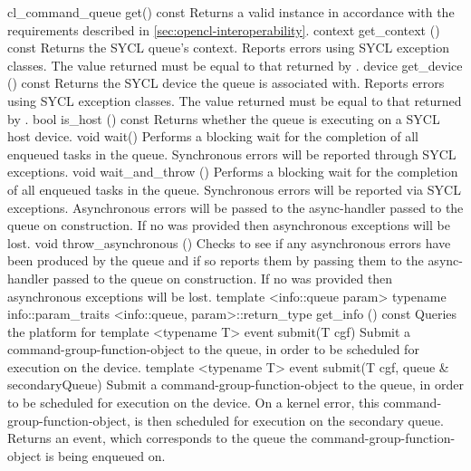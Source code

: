   \addRow
    {cl_command_queue get() const}
    {   
      Returns a valid  instance in accordance with the requirements described in \ref{sec:opencl-interoperability}.    
    }
  \addRow
    {context get_context () const}
    {
      Returns the SYCL queue's context.
      Reports errors using SYCL exception classes.
      The value returned must be equal to that returned by .
    }
  \addRow
    {device get_device () const}
    {
      Returns the SYCL device the queue is associated with.
      Reports errors using SYCL exception classes.
      The value returned must be equal to that returned by .
    }
  \addRow
   {bool is_host () const}
   {
      Returns whether the queue is executing on a SYCL host device.
   }
  \addRow
    {void wait() }
    {
      Performs a blocking wait for the completion of all enqueued tasks
      in the queue.  Synchronous errors will be reported through SYCL
      exceptions.
    }
  \addRow
    {void wait_and_throw () }
    {
      Performs a blocking wait for the completion of all enqueued tasks
      in the queue.  Synchronous errors will be reported via SYCL
      exceptions. Asynchronous errors will be passed to the
      \gls{async-handler} passed to the queue on
      construction. If no  was provided then
      asynchronous exceptions will be lost.
    }
  \addRow
    {void throw_asynchronous () }
    {
      Checks to see if any asynchronous errors have been produced by
      the queue and if so reports them by passing them to the
      \gls{async-handler} passed to the queue on
      construction. If no  was provided then
      asynchronous exceptions will be lost.
    }
  \addRowFourL
    { template <info::queue param> }
    {  typename info::param_traits}
    {  <info::queue, param>::return_type}
    {  get_info ()  const}
    {Queries the platform for }
  \addRowTwoL
    {template <typename T>}
    {event submit(T cgf)}
    {Submit a \gls{command-group-function-object} to the queue, in order to be scheduled
    for execution on the device.}
  \addRowThreeL
    {template <typename T>}
    {event submit(T cgf,}
    {             queue \& secondaryQueue)}
    {Submit a \gls{command-group-function-object} to the queue, in order to be scheduled
    for execution on the device. On a kernel error, this \gls{command-group-function-object},
    is then scheduled for execution on the secondary queue. Returns an
    event, which corresponds to the queue the \gls{command-group-function-object}
    is being enqueued on.}
\completeTable

